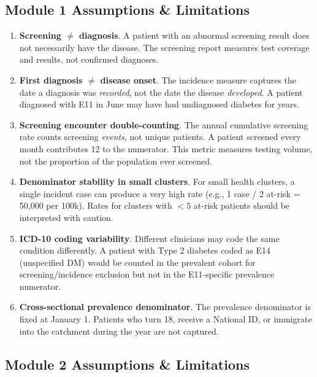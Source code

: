 \documentclass[11pt,a4paper]{article}
\begin{document}
\subsection{Module 1 Assumptions \& Limitations}

\begin{enumerate}[leftmargin=*, label=\textbf{M1-L\arabic*}]
    \item \textbf{Screening $\neq$ diagnosis}. A patient with an abnormal screening result does not necessarily have the disease. The screening report measures test coverage and results, not confirmed diagnoses.
    \item \textbf{First diagnosis $\neq$ disease onset}. The incidence measure captures the date a diagnosis was \textit{recorded}, not the date the disease \textit{developed}. A patient diagnosed with E11 in June may have had undiagnosed diabetes for years.
    \item \textbf{Screening encounter double-counting}. The annual cumulative screening rate counts screening \textit{events}, not unique patients. A patient screened every month contributes 12 to the numerator. This metric measures testing volume, not the proportion of the population ever screened.
    \item \textbf{Denominator stability in small clusters}. For small health clusters, a single incident case can produce a very high rate (e.g., 1 case / 2 at-risk = 50,000 per 100k). Rates for clusters with $< 5$ at-risk patients should be interpreted with caution.
    \item \textbf{ICD-10 coding variability}. Different clinicians may code the same condition differently. A patient with Type 2 diabetes coded as E14 (unspecified DM) would be counted in the prevalent cohort for screening/incidence exclusion but not in the E11-specific prevalence numerator.
    \item \textbf{Cross-sectional prevalence denominator}. The prevalence denominator is fixed at January 1. Patients who turn 18, receive a National ID, or immigrate into the catchment during the year are not captured.
\end{enumerate}

\subsection{Module 2 Assumptions \& Limitations}
\end{document}
